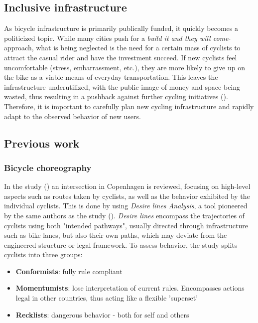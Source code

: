 \subsection{Inclusive infrastructure}
As bicycle infrastructure is primarily publically funded, it quickly becomes a politicized topic. 
While many cities push for a \textit{build it and they will come}-approach, what is being neglected
is the need for a certain mass of cyclists to attract the casual rider and have the investment succeed.
If new cyclists feel uncomfortable (stress, embarrassment, etc.), they are more likely to give up on the bike as a viable means of everyday transportation. 
This leaves the infrastructure underutilized, with the public image of money and space being wasted, 
thus resulting in a pushback against further cycling initiatives (\cite{backlash}).
Therefore, it is important to carefully plan new cycling infrastructure and rapidly adapt to the observed behavior of new users.

\subsection{Previous work}

\subsubsection{Bicycle choreography}
In the study (\cite{copenhagenize2014}) an intersection in Copenhagen is reviewed, focusing on high-level aspects
such as routes taken by cyclists, as well as the behavior exhibited by the individual cyclists.
This is done by using \textit{Desire lines Analysis}, a tool pioneered by the same authors as the study (\cite{copenhagenize_book}).
\textit{Desire lines} encompass the trajectories of cyclists using both "intended pathways", usually directed through infrastructure such as
 bike lanes, but also their own paths, which may deviate from the engineered structure or legal framework.
 To assess behavior, the study splits cyclists into three groups:

\begin{itemize}
	\item \textbf{Conformists}: fully rule compliant
	\item \textbf{Momentumists}: lose interpretation of current rules. Encompasses actions legal in other countries, thus acting like a  flexible 'superset'
	\item \textbf{Recklists}: dangerous behavior - both for self and others
\end{itemize}

